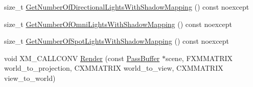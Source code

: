 \begin{DoxyCompactItemize}
size\+\_\+t \hyperlink{structmage_1_1_l_buffer_pass_a14764bc764ed13614595262ddc42ca9e}{Get\+Number\+Of\+Directional\+Lights\+With\+Shadow\+Mapping} () const noexcept
\item 
size\+\_\+t \hyperlink{structmage_1_1_l_buffer_pass_a1efc71062a28fb33474e4ea9a05e9e34}{Get\+Number\+Of\+Omni\+Lights\+With\+Shadow\+Mapping} () const noexcept
\item 
size\+\_\+t \hyperlink{structmage_1_1_l_buffer_pass_a30a1b4e2147eae73633fc33bd10d5f2f}{Get\+Number\+Of\+Spot\+Lights\+With\+Shadow\+Mapping} () const noexcept
\item 
void X\+M\+\_\+\+C\+A\+L\+L\+C\+O\+NV \hyperlink{structmage_1_1_l_buffer_pass_aceac1e190b0236625b8cc9be5365b043}{Render} (const \hyperlink{structmage_1_1_pass_buffer}{Pass\+Buffer} $\ast$scene, F\+X\+M\+M\+A\+T\+R\+IX world\+\_\+to\+\_\+projection, C\+X\+M\+M\+A\+T\+R\+IX world\+\_\+to\+\_\+view, C\+X\+M\+M\+A\+T\+R\+IX view\+\_\+to\+\_\+world)
\end{DoxyCompactItemize}
